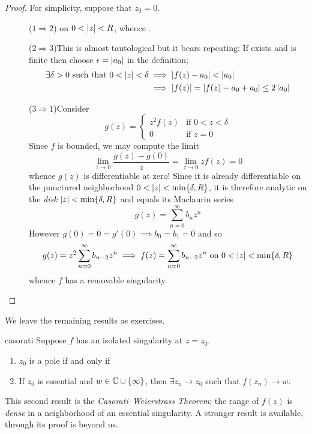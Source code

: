\begin{proof}
For simplicity, suppose that $z_0=0$.
\begin{description}
  \item[]($1\Rightarrow 2$)\quad {} on $0<\left| z\right|<R$, whence .
	\item[]($2\Rightarrow 3$)\quad This is almost tautological but it bears repeating: If  exists and is finite then choose $\epsilon=\left| a_0\right|$ in the definition;
	\begin{align*}
	\exists \delta>0\text{ such that }0<\left| z\right|<\delta&\implies \left| f(z)-a_0\right|<\left| a_0\right|\\
	&\implies \left| f(z)\right|=\left| f(z)-a_0+a_0\right|\le 2\left| a_0\right|
	\end{align*}
	\item[]($3\Rightarrow 1$)\quad Consider
	\[g(z)=\begin{cases}
	z^2f(z)&\text{if }0<z<\delta\\
	0&\text{if }z=0
	\end{cases}\]
	Since $f$ is bounded, we may compute the limit
	\[\lim_{z\to 0}\frac{g(z)-g(0)}{z}=\lim_{z\to 0}zf(z)=0\]
	whence $g(z)$ is differentiable at zero! Since it is already differentiable on the punctured neighborhood $0<\left| z\right|<\min\{\delta,R\}$, it is therefore analytic on the \emph{disk} $\left| z\right|<\min\{\delta,R\}$ and equals its Maclaurin series
	\[g(z)=\sum_{n=0}^\infty b_nz^n\]
	However $g(0)=0=g'(0)\implies b_0=b_1=0$ and so
	\[g(z)=z^2\sum_{n=0}^\infty b_{n-2}z^n\implies f(z)=\sum\limits_{n=0}^\infty b_{n-2}z^n\text { on }0<\left| z\right|<\min\{\delta,R\}\]
	whence $f$ has a removable singularity.\qedhere
\end{description}
\end{proof}

We leave the remaining results as exercises.
\begin{thm}{}{casorati}
Suppose $f$ has an isolated singularity at $z=z_0$.
\begin{enumerate}
  \item $z_0$ is a pole if and only if 
  \item If $z_0$ is essential and $w\in\mathbb{C}\cup\{\infty\}$, then $\exists z_n\to z_0$ such that $f(z_n)\to w$. 
\end{enumerate}
\end{thm}

This second result is the \emph{Casorati--Weierstrass Theorem}; the range of $f(z)$ is \emph{dense} in a neighborhood of an essential singularity. A stronger result is available, through its proof is beyond us.

